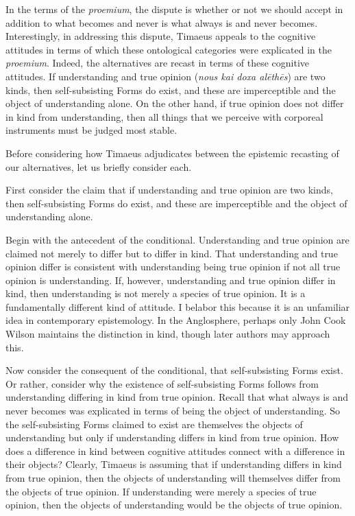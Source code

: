 In the terms of the \emph{proemium}, the dispute is whether or not we should accept in addition to what becomes and never is what always is and never becomes. Interestingly, in addressing this dispute, Timaeus appeals to the cognitive attitudes in terms of which these ontological categories were explicated in the \emph{proemium}. Indeed, the alternatives are recast in terms of these cognitive attitudes. If understanding and true opinion (\emph{nous kai doxa alēthēs}) are two kinds, then self-subsisting Forms do exist, and these are imperceptible and the object of understanding alone. On the other hand, if true opinion does not differ in kind from understanding, then all things that we perceive with corporeal instruments must be judged most stable.

Before considering how Timaeus adjudicates between the epistemic recasting of our alternatives, let us briefly consider each.

First consider the claim that if understanding and true opinion are two kinds, then self-subsisting Forms do exist, and these are imperceptible and the object of understanding alone. 

Begin with the antecedent of the conditional. Understanding and true opinion are claimed not merely to differ but to differ in kind. That understanding and true opinion differ is consistent with understanding being true opinion if not all true opinion is understanding. If, however, understanding and true opinion differ in kind, then understanding is not merely a species of true opinion. It is a fundamentally different kind of attitude. I belabor this because it is an unfamiliar idea in contemporary epistemology. In the Anglosphere, perhaps only John Cook Wilson maintains the distinction in kind, though later authors may approach this.

Now consider the consequent of the conditional, that self-subsisting Forms exist. Or rather, consider why the existence of self-subsisting Forms follows from understanding differing in kind from true opinion. Recall that what always is and never becomes was explicated in terms of being the object of understanding. So the self-subsisting Forms claimed to exist are themselves the objects of understanding but only if understanding differs in kind from true opinion. How does a difference in kind between cognitive attitudes connect with a difference in their objects? Clearly, Timaeus is assuming that if understanding differs in kind from true opinion, then the objects of understanding will themselves differ from the objects of true opinion. If understanding were merely a species of true opinion, then the objects of understanding would be the objects of true opinion. 

